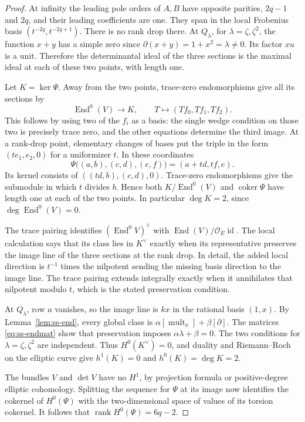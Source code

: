 \documentclass[11pt]{article}
\theoremstyle{definition}\newtheorem{definition}[theorem]{Definition}
\theoremstyle{remark}\newtheorem{remark}[theorem]{Remark}
\newcommand{\OO}{\mathcal O}
\newcommand{\End}{\operatorname{End}}
\newcommand{\rk}{\operatorname{rank}}
\begin{document}
\begin{proof}
At infinity the leading pole orders of $A,B$ have opposite parities, $2q-1$ and $2q$, and their leading coefficients are one. They span in the local Frobenius basis $(t^{-2q},t^{-2q+1})$. There is no rank drop there. At $Q_\lambda$, for $\lambda=\zeta,\zeta^2$, the function $x+y$ has a simple zero since $\partial(x+y)=1+x^2=\lambda\ne0$. Its factor $xu$ is a unit. Therefore the determinantal ideal of the three sections is the maximal ideal at each of these two points, with length one.

Let $K=\ker\Psi$. Away from the two points, trace-zero endomorphisms give all its sections by
\[
                \End^0(V)\longrightarrow K,\qquad
                T\longmapsto(Tf_0,Tf_1,Tf_2).
\]
This follows by using two of the $f_i$ as a basis: the single wedge condition on those two is precisely trace zero, and the other equations determine the third image. At a rank-drop point, elementary changes of bases put the triple in the form $(te_1,e_2,0)$ for a uniformizer $t$. In these coordinates
\[
 \Psi\bigl((a,b),(c,d),(e,f)\bigr)=(a+td,tf,e).
\]
Its kernel consists of $((td,b),(c,d),0)$. Trace-zero endomorphisms give the submodule in which $t$ divides $b$. Hence both $K/\End^0(V)$ and $\operatorname{coker}\Psi$ have length one at each of the two points. In particular $\deg K=2$, since $\deg\End^0(V)=0$.

The trace pairing identifies $(\End^0 V)^\vee$ with $\End(V)/\OO_E\operatorname{id}$. The local calculation says that its class lies in $K^\vee$ exactly when its representative preserves the image line of the three sections at the rank drop. In detail, the added local direction is $t^{-1}$ times the nilpotent sending the missing basis direction to the image line. The trace pairing extends integrally exactly when it annihilates that nilpotent modulo $t$, which is the stated preservation condition.

At $Q_\lambda$, row $a$ vanishes, so the image line is $kx$ in the rational basis $(1,x)$. By Lemma~\ref{lem:ss-end}, every global class is $\alpha[\operatorname{mult}_x]+\beta[\partial]$. The matrices \eqref{eq:ss-endmat} show that preservation imposes $\alpha\lambda+\beta=0$. The two conditions for $\lambda=\zeta,\zeta^2$ are independent. Thus $H^0(K^\vee)=0$, and duality and Riemann--Roch on the elliptic curve give $h^1(K)=0$ and $h^0(K)=\deg K=2$.

The bundles $V$ and $\det V$ have no $H^1$, by projection formula or positive-degree elliptic cohomology. Splitting the sequence for $\Psi$ at its image now identifies the cokernel of $H^0(\Psi)$ with the two-dimensional space of values of its torsion cokernel. It follows that $\rk H^0(\Psi)=6q-2$.


\end{proof}
\end{document}

